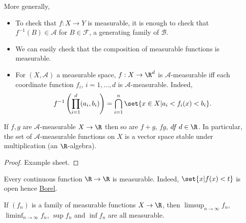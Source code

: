 \documentclass{article}
\newcommand{\1}[1]{\mathbbm{1}_{#1}}
\begin{document}
More generally,

\begin{remark}
    \leavevmode
    \begin{itemize}
        \item To check that $f: X \to Y$ is measurable, it is enough to check that $f^{-1}(B) \in \mathcal{A}$ for $B \in \mathcal{F}$, a generating family of $\mathcal{B}$.
        \item We can easily check that the composition of measurable functions is measurable.
        \item For $(X, \mathcal{A})$ a measurable space, $f:X \to \R^d$ is $\mathcal{A}$-measurable iff each coordinate function $f_i$, $i = 1,\dotsc,d$ is $\mathcal{A}$-measurable.
            Indeed,
            \begin{equation*}
                f^{-1}\left(\prod_{i=1}^d (a_i, b_i)\right) = \bigcap_{i=1}^n \set{x \in X | a_i < f_i(x) < b_i}.
            \end{equation*}
    \end{itemize}
\end{remark}

\begin{prop}
    If $f, g$ are $\mathcal{A}$-measurable $X \to \R$ then so are $f+g$, $fg$, $d f \; d \in \R$.
    In particular, the set of $\mathcal{A}$-measurable functions on $X$ is a vector space stable under multiplication (an $\R$-algebra).
\end{prop}
\begin{proof}Example sheet.
\end{proof}

\begin{remark}
    Every continuous function $\R \to \R$ is measurable. Indeed, $\set{x | f(x) < t}$ is open hence \hyperlink{def:borelAlg}{Borel}.
\end{remark}

\begin{prop}
    If $(f_n)$ is a family of measurable functions $X \to \R$, then $\limsup_{n \to \infty} f_n$, $\liminf_{n \to \infty} f_n$, $\sup f_n$ and $\inf f_n$ are all measurable.
\end{prop}
\end{document}
